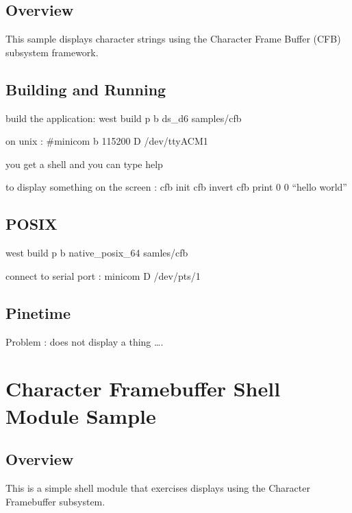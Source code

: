\documentclass[letterpaper,10pt,english]{sphinxmanual}
\begin{document}
\subsection{Overview}
\label{\detokenize{samples/samplescfbREADME:overview}}
This sample displays character strings using the Character Frame Buffer
(CFB) subsystem framework.


\subsection{Building and Running}
\label{\detokenize{samples/samplescfbREADME:building-and-running}}
build the application: west build \sphinxhyphen{}p \sphinxhyphen{}b ds\_d6 samples/cfb

on unix : \#minicom \sphinxhyphen{}b 115200 \sphinxhyphen{}D /dev/ttyACM1

you get a shell and you can type help

to display something on the screen :
cfb init
cfb invert
cfb print 0 0 “hello world”


\subsection{POSIX}
\label{\detokenize{samples/samplescfbREADME:posix}}
west build \sphinxhyphen{}p \sphinxhyphen{}b native\_posix\_64 samles/cfb

connect to serial port :
minicom \sphinxhyphen{}D /dev/pts/1


\subsection{Pinetime}
\label{\detokenize{samples/samplescfbREADME:pinetime}}
Problem : does not display a thing ….


\section{Character Framebuffer Shell Module Sample}
\label{\detokenize{samples/samplescfb_shellREADME:character-framebuffer-shell-module-sample}}\label{\detokenize{samples/samplescfb_shellREADME:cfb-shell-sample}}\label{\detokenize{samples/samplescfb_shellREADME::doc}}

\subsection{Overview}
\label{\detokenize{samples/samplescfb_shellREADME:overview}}
This is a simple shell module that exercises displays using the Character
Framebuffer subsystem.
\end{document}
